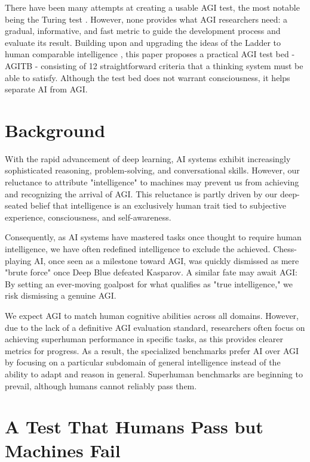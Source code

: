\documentclass{article}
\begin{document}
There have been many attempts at creating a usable AGI test, the most notable being the Turing test \cite{Turing1950}. However, none provides what AGI researchers need: a gradual, informative, and fast metric to guide the development process and evaluate its result. Building upon and upgrading the ideas of the Ladder to human comparable intelligence \cite{Sprogar2018}, this paper proposes a practical AGI test bed - AGITB - consisting of 12 straightforward criteria that a thinking system must be able to satisfy. Although the test bed does not warrant consciousness, it helps separate AI from AGI.


\section{Background}

With the rapid advancement of deep learning, AI systems exhibit increasingly sophisticated reasoning, problem-solving, and conversational skills. However, our reluctance to attribute "intelligence" to machines may prevent us from achieving and recognizing the arrival of AGI. This reluctance is partly driven by our deep-seated belief that intelligence is an exclusively human trait tied to subjective experience, consciousness, and self-awareness. 

Consequently, as AI systems have mastered tasks once thought to require human intelligence, we have often redefined intelligence to exclude the achieved. Chess-playing AI, once seen as a milestone toward AGI, was quickly dismissed as mere "brute force" once Deep Blue defeated Kasparov. A similar fate may await AGI: By setting an ever-moving goalpost for what qualifies as "true intelligence," we risk dismissing a genuine AGI. 

We expect AGI to match human cognitive abilities across all domains. However, due to the lack of a definitive AGI evaluation standard, researchers often focus on achieving superhuman performance in specific tasks, as this provides clearer metrics for progress. As a result, the specialized benchmarks prefer AI over AGI by focusing on a particular subdomain of general intelligence instead of the ability to adapt and reason in general. Superhuman benchmarks are beginning to prevail, although humans cannot reliably pass them.

\section{A Test That Humans Pass but Machines Fail}
\end{document}
